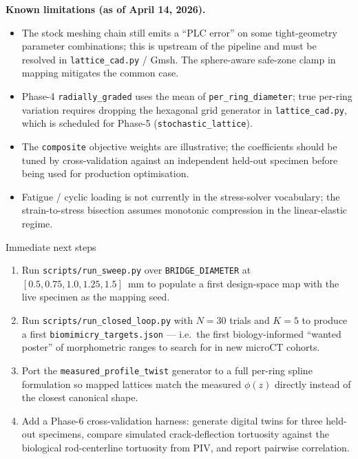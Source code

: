 \documentclass[11pt, letterpaper]{article}
\begin{document}
\begin{limitbox}
\textbf{Known limitations (as of April 14, 2026).}
\begin{itemize}
  \item The stock meshing chain still emits a ``PLC error'' on some tight-geometry parameter combinations; this is upstream of the pipeline and must be resolved in \texttt{lattice\_cad.py} / Gmsh. The sphere-aware safe-zone clamp in mapping mitigates the common case.
  \item Phase-4 \texttt{radially\_graded} uses the mean of \texttt{per\_ring\_diameter}; true per-ring variation requires dropping the hexagonal grid generator in \texttt{lattice\_cad.py}, which is scheduled for Phase-5 (\texttt{stochastic\_lattice}).
  \item The \texttt{composite} objective weights are illustrative; the coefficients should be tuned by cross-validation against an independent held-out specimen before being used for production optimisation.
  \item Fatigue / cyclic loading is not currently in the stress-solver vocabulary; the strain-to-stress bisection assumes monotonic compression in the linear-elastic regime.
\end{itemize}
\end{limitbox}

\begin{conclusionbox}{Immediate next steps}
\begin{enumerate}
  \item Run \texttt{scripts/run\_sweep.py} over \texttt{BRIDGE\_DIAMETER} at $[0.5, 0.75, 1.0, 1.25, 1.5]$~mm to populate a first design-space map with the live specimen as the mapping seed.
  \item Run \texttt{scripts/run\_closed\_loop.py} with $N = 30$ trials and $K = 5$ to produce a first \texttt{biomimicry\_targets.json} --- i.e.\ the first biology-informed ``wanted poster'' of morphometric ranges to search for in new microCT cohorts.
  \item Port the \texttt{measured\_profile\_twist} generator to a full per-ring spline formulation so mapped lattices match the measured $\phi(z)$ directly instead of the closest canonical shape.
  \item Add a Phase-6 cross-validation harness: generate digital twins for three held-out specimens, compare simulated crack-deflection tortuosity against the biological rod-centerline tortuosity from PIV, and report pairwise correlation.
\end{enumerate}
\end{conclusionbox}
\end{document}
